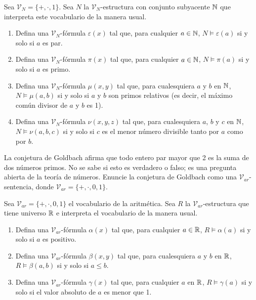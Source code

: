 \message{ !name(main.tex)}\documentclass[12pt,a4paper]{book}
\newcommand{\VV}{\mathcal{V}}
\begin{document}
    \begin{ejercicio}
        Sea $\VV_{N}=\{+,\cdot,1\}$. Sea $N$ la $\VV_{N}$-estructura con conjunto subyacente $\mathbb{N}$ que interpreta este
        vocabulario de la manera usual.
        \begin{enumerate}[label=(\alph*)]
            \item Defina una $\VV_{N}$-fórmula $\varepsilon(x)$ tal que, para cualquier $a\in\mathbb{N}$, $N\models\varepsilon(a)$
            si y solo si $a$ es par.
            \item Defina una $\VV_{N}$-fórmula $\pi(x)$ tal que, para cualquier $a\in\mathbb{N}$, $N\models\pi(a)$ si y solo si $a$
            es primo.
            \item Defina una $\VV_{N}$-fórmula $\mu(x,y)$ tal que, para cualesquiera $a$ y $b$ en $\mathbb{N}$, $N\models\mu(a,b)$
            si y solo si $a$ y $b$ son primos relativos (es decir, el máximo común divisor de $a$ y $b$ es 1).
            \item Defina una $\VV_{N}$-fórmula $\nu(x,y,z)$ tal que, para cualesquiera $a$, $b$ y $c$ en $\mathbb{N}$,
            $N\models\nu(a,b,c)$ si y solo si $c$ es el menor número divisible tanto por $a$ como por $b$.
        \end{enumerate}
    \end{ejercicio}

    \begin{ejercicio}
        La conjetura de Goldbach afirma que todo entero par mayor que 2 es la suma de dos números primos. No se sabe si
        esto es verdadero o falso; es una pregunta abierta de la teoría de números. Enuncie la conjetura de Goldbach como
        una $\VV_{ar}$-sentencia, donde $\VV_{ar}=\{+,\cdot,0,1\}$.
    \end{ejercicio}

    \begin{ejercicio}
        Sea $\VV_{ar}=\{+,\cdot,0,1\}$ el vocabulario de la aritmética. Sea $R$ la $\VV_{ar}$-estructura que tiene
        universo $\mathbb{R}$ e interpreta el vocabulario de la manera usual.
        \begin{enumerate}[label=(\alph*)]
            \item Defina una $\VV_{ar}$-fórmula $\alpha(x)$ tal que, para cualquier $a\in\mathbb{R}$, $R\models\alpha(a)$ si y solo
            si $a$ es positivo.
            \item Defina una $\VV_{ar}$-fórmula $\beta(x,y)$ tal que, para cualesquiera $a$ y $b$ en $\mathbb{R}$, $R\models\beta(a,b)$
            si y solo si $a\leq b$.
            \item Defina una $\VV_{ar}$-fórmula $\gamma(x)$ tal que, para cualquier $a$ en $\mathbb{R}$, $R\models\gamma(a)$ si y
            solo si el valor absoluto de $a$ es menor que 1.
        \end{enumerate}
    \end{ejercicio}
\end{document}
